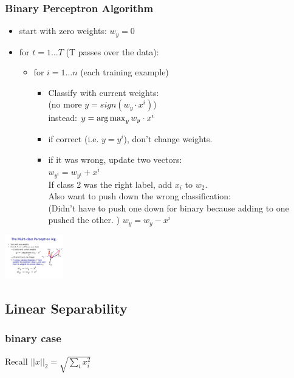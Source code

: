  \subsubsection{Binary Perceptron Algorithm}
 \begin{itemize}
 	\item start with zero weights: $w_y=0$
	\item for $ t = 1 \dots T$ (T passes over the data):
		\begin{itemize}
			\item for $i = 1 \dots n$ (each training example)
			\begin{itemize}
				\item  Classify with current weights: \hfill \\
					(no more $ y = sign(w_y \cdot x^i)$) \hfill \\
					instead:  $y= \operatorname*{arg\,max}_y w_y \cdot x^i$ \hfill \\
				\item if correct (i.e. $y = y^i$), don't change weights.
				\item if it was wrong, update two vectors: \hfill \\
					$w_{y^i} = w_{y^i} + x^i$ \hfill \\
					If class 2 was the right label, add $x_i$ to $w_2$. \hfill \\
					Also want to push down the wrong classification:  \hfill \\
					(Didn't have to push one down for binary because adding to one pushed the other. )
					$w_y = w_y -x^i$ \hfill \\
			\end{itemize}
		\end{itemize}
 \end{itemize}
 \includegraphics[width=1.0in]{figures/multi_perceptron_rule.pdf}
 
 \subsection{Linear Separability}
 \subsubsection{binary case}
Recall $ \displaystyle  ||x||_2 = \sqrt{\sum_i x_i^2}$ 
 
